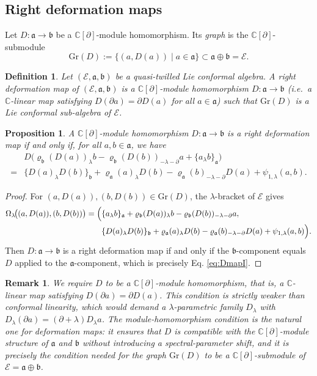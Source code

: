 \documentclass[a4paper,11pt]{article}
\def\Rg{\mathbb{C}[\partial]}
\def\Ep{\mathcal{E}}
\def\Vs{\mathfrak{a}}
\def\Ws{\mathfrak{b}}
\def\rep{\varrho}
\def\str{\Omega}
\def\la{\lambda}
\def\p{\partial}
\def\C{\mathbb{C}}
\numberwithin{equation}{section}
\newtheorem{definition}[theorem]{Definition}
\newtheorem{proposition}[theorem]{Proposition}
\newtheorem{remark}[theorem]{Remark}
\begin{document}
\subsection{Right deformation maps}
\label{subsec:DmapI}
 

Let $D:\Vs\to\Ws$ be a $\Rg$-module homomorphism.  Its \textit{graph} is the $\Rg$-submodule
\[
  \mathrm{Gr}(D) := \{(a,D(a))\mid a\in\Vs\} \subset \Vs\oplus\Ws = \Ep.
\]

 
\begin{definition}\label{def:DmapI}
Let $(\Ep,\Vs,\Ws)$ be a quasi-twilled Lie conformal algebra.
A right deformation map of $(\Ep,\Vs,\Ws)$
is a $\Rg$-module homomorphism $D:\Vs\longrightarrow\Ws$
(i.e.\ a $\C$-linear map satisfying $D(\p a)=\p D(a)$ for all $a\in\Vs$)
such that $\mathrm{Gr}(D)$ is a  Lie conformal sub-algebra of $\Ep$.
\end{definition}

 
\begin{proposition}\label{prop:graph-DmapI}
A $\Rg$-module homomorphism $D:\Vs\to\Ws$ is a right deformation map  if and only if, for all $a,b\in\Vs$, we have
\begin{align}
&  D\!\bigl(\rep_\Ws(D(a))_\la b - \rep_\Ws(D(b))_{-\la-\p}a
           + \{a_\la b\}_\Vs\bigr) \nonumber \\
  =&  \{D(a)_\la D(b)\}_\Ws
    + \rep_\Vs(a)_\la D(b) - \rep_\Vs(b)_{-\la-\p}D(a)
    + \psi_{1,\la}(a,b). \label{eq:DmapI}
\end{align}

\end{proposition}
 
\begin{proof}
For $(a,D(a)),(b,D(b))\in\mathrm{Gr}(D)$, the $\la$-bracket of $\Ep$ gives
\begin{align*}
  \str_\la\!\bigl((a,D(a)),(b,D(b))\bigr)
  = \Bigl(
    &\{a_\la b\}_\Vs + \rep_\Ws(D(a))_\la b
       - \rep_\Ws(D(b))_{-\la-\p}a,\\
    &\{D(a)_\la D(b)\}_\Ws + \rep_\Vs(a)_\la D(b)
       - \rep_\Vs(b)_{-\la-\p}D(a) + \psi_{1,\la}(a,b)
  \Bigr).
\end{align*}
Then $D:\Vs\to\Ws$ is a right deformation map if and only if the $\Ws$-component equals
$D$ applied to the $\Vs$-component, which is precisely Eq. \eqref{eq:DmapI}.
\end{proof}



 
\begin{remark}\label{rmk:module-hom}
We require $D$ to be a $\Rg$-\emph{module} homomorphism, that is, a
$\C$-linear map satisfying $D(\p a)=\p D(a)$.  This condition is
strictly weaker than conformal linearity, which would demand a
$\la$-parametric family $D_\la$ with $D_\la(\p a)=(\p+\la)D_\la a$.
The module-homomorphism condition is the natural one for deformation
maps: it ensures that $D$ is compatible with the $\Rg$-module structure
of $\Vs$ and $\Ws$ without introducing a spectral-parameter shift, and
it is precisely the condition needed for the graph $\mathrm{Gr}(D)$ to
be a $\Rg$-submodule of $\Ep=\Vs\oplus\Ws$.
\end{remark}
 
\end{document}
